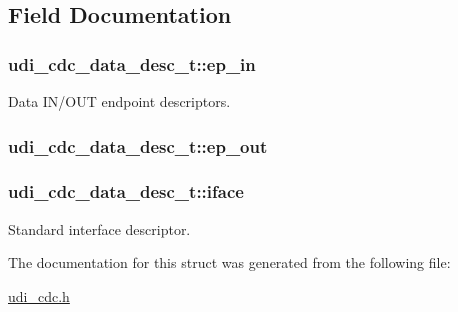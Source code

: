 \subsection{\-Field \-Documentation}
\hypertarget{structudi__cdc__data__desc__t_af219d67a67805d90e0c5064dd4ab2c29}{
\subsubsection[{ep\-\_\-in}]{ {\bf udi\-\_\-cdc\-\_\-data\-\_\-desc\-\_\-t\-::ep\-\_\-in}}}
\label{structudi__cdc__data__desc__t_af219d67a67805d90e0c5064dd4ab2c29}


\-Data \-I\-N/\-O\-U\-T endpoint descriptors. 

\hypertarget{structudi__cdc__data__desc__t_a0be1a0edc207babda9677cbf34ac29c4}{
\subsubsection[{ep\-\_\-out}]{ {\bf udi\-\_\-cdc\-\_\-data\-\_\-desc\-\_\-t\-::ep\-\_\-out}}}
\label{structudi__cdc__data__desc__t_a0be1a0edc207babda9677cbf34ac29c4}
\hypertarget{structudi__cdc__data__desc__t_a1c46d591be0f1fc12b6b79b43143c903}{
\subsubsection[{iface}]{ {\bf udi\-\_\-cdc\-\_\-data\-\_\-desc\-\_\-t\-::iface}}}
\label{structudi__cdc__data__desc__t_a1c46d591be0f1fc12b6b79b43143c903}


\-Standard interface descriptor. 



\-The documentation for this struct was generated from the following file\-:\begin{DoxyCompactItemize}
\item 
\hyperlink{udi__cdc_8h}{udi\-\_\-cdc.\-h}\end{DoxyCompactItemize}
